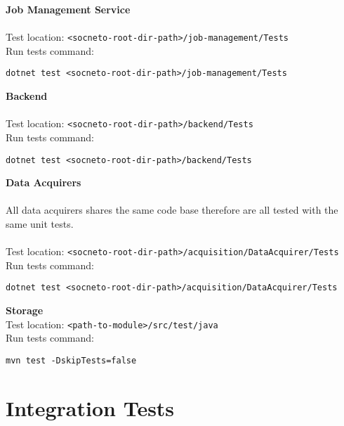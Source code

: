 \textbf{Job Management Service}
\\ \\
Test location: \texttt{<socneto-root-dir-path>/job-management/Tests}\\
Run tests command: 
\begin{lstlisting}[style=DOS]
dotnet test <socneto-root-dir-path>/job-management/Tests 
\end{lstlisting}
\vspace{\baselineskip}
\textbf{Backend}
\\ \\
Test location: \texttt{<socneto-root-dir-path>/backend/Tests}\\
Run tests command: \begin{lstlisting}[style=DOS]
dotnet test <socneto-root-dir-path>/backend/Tests
\end{lstlisting}
\vspace{\baselineskip}
\textbf{Data Acquirers}
\\ \\
All data acquirers shares the same code base therefore are all tested with the same unit tests.\\ \\
Test location: \texttt{<socneto-root-dir-path>/acquisition/DataAcquirer/Tests}\\
Run tests command: \begin{lstlisting}[style=DOS]
dotnet test <socneto-root-dir-path>/acquisition/DataAcquirer/Tests
\end{lstlisting}
\vspace{\baselineskip}
\textbf{Storage }\\
Test location: \texttt{<path-to-module>/src/test/java}\\
Run tests command: \begin{lstlisting}[style=DOS]
mvn test -DskipTests=false
\end{lstlisting}


\section{Integration Tests}


